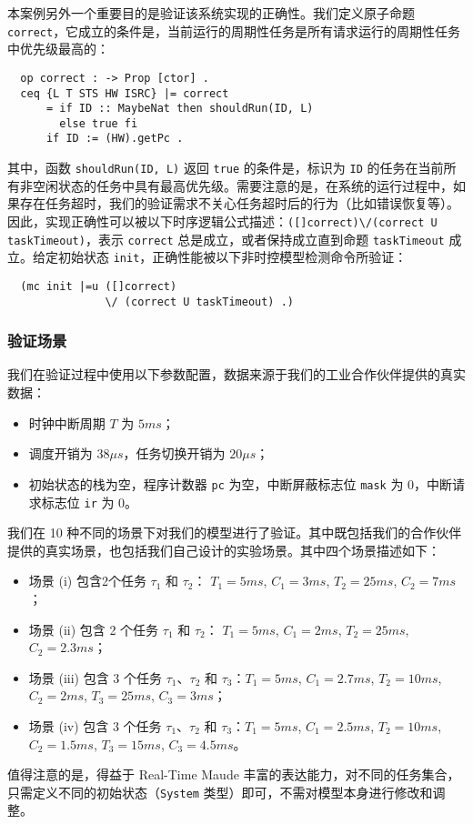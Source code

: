 本案例另外一个重要目的是验证该系统实现的正确性。我们定义原子命题 \verb|correct|，它成立的条件是，当前运行的周期性任务是所有请求运行的周期性任务中优先级最高的：
\begin{verbatim}
  op correct : -> Prop [ctor] .
  ceq {L T STS HW ISRC} |= correct
      = if ID :: MaybeNat then shouldRun(ID, L)
        else true fi
      if ID := (HW).getPc .
\end{verbatim}
其中，函数 \verb|shouldRun(ID, L)| 返回 \verb|true| 的条件是，标识为 \verb|ID| 的任务在当前所有非空闲状态的任务中具有最高优先级。需要注意的是，在系统的运行过程中，如果存在任务超时，我们的验证需求不关心任务超时后的行为（比如错误恢复等）。因此，实现正确性可以被以下时序逻辑公式描述：\verb|([]correct)\/(correct U taskTimeout)|，表示 \verb|correct| 总是成立，或者保持成立直到命题 \verb|taskTimeout| 成立。给定初始状态 \verb|init|，正确性能被以下非时控模型检测命令所验证：
\begin{verbatim} 
  (mc init |=u ([]correct) 
               \/ (correct U taskTimeout) .)
\end{verbatim}

\subsubsection{验证场景}
\label{ss:results} 
我们在验证过程中使用以下参数配置，数据来源于我们的工业合作伙伴提供的真实数据：
\begin{itemize}
\item 时钟中断周期 $T$ 为 $5ms$；
\item 调度开销为 $38{\mu}s$，任务切换开销为 $20{\mu}s$；
\item 初始状态的栈为空，程序计数器 \verb|pc| 为空，中断屏蔽标志位 \verb|mask| 为 0，中断请求标志位 \verb|ir| 为 0。
\end{itemize}

我们在 10 种不同的场景下对我们的模型进行了验证。其中既包括我们的合作伙伴提供的真实场景，也包括我们自己设计的实验场景。其中四个场景描述如下：
\begin{itemize}
\item 场景 (i) 包含2个任务 $\tau_1$ 和 $\tau_2$： $T_1=5ms$, $C_1=3ms$, $T_2=25ms$, $C_2=7ms$；
\item 场景 (ii) 包含 2 个任务 $\tau_1$ 和 $\tau_2$： $T_1=5ms$, $C_1=2ms$, $T_2=25ms$, $C_2=2.3ms$；
\item 场景 (iii) 包含 3 个任务 $\tau_1$、$\tau_2$ 和 $\tau_3$：$T_1=5ms$, $C_1=2.7ms$, $T_2=10ms$, $C_2=2ms$, $T_3=25ms$, $C_3=3ms$；
\item 场景 (iv) 包含 3 个任务 $\tau_1$、$\tau_2$ 和 $\tau_3$：$T_1=5ms$, $C_1=2.5ms$, $T_2=10ms$, $C_2=1.5ms$, $T_3=15ms$, $C_3=4.5ms$。
\end{itemize}
值得注意的是，得益于 Real-Time Maude 丰富的表达能力，对不同的任务集合，只需定义不同的初始状态（\verb|System| 类型）即可，不需对模型本身进行修改和调整。

